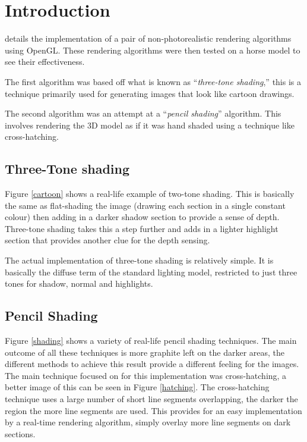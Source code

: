 \section{Introduction}
   details the implementation of a pair of non-photorealistic
  rendering algorithms using OpenGL.  These rendering algorithms were then
  tested on a horse model to see their effectiveness.

  The first algorithm was based off what is known as ``\emph{three-tone
  shading},'' this is a technique primarily used for generating images that look
  like cartoon drawings.

  The second algorithm was an attempt at a ``\emph{pencil shading}'' algorithm.
  This involves rendering the 3D model as if it was hand shaded using a
  technique like cross-hatching.

  \subsection{Three-Tone shading}

    Figure \ref{cartoon} shows a real-life example of two-tone shading.  This is
    basically the same as flat-shading the image (drawing each section in a
    single constant colour) then adding in a darker shadow section to provide a
    sense of depth.  Three-tone shading takes this a step further and adds in a
    lighter highlight section that provides another clue for the depth sensing.

    The actual implementation of three-tone shading is relatively simple.  It is
    basically the diffuse term of the standard lighting model, restricted to
    just three tones for shadow, normal and highlights.

  \subsection{Pencil Shading}

    Figure \ref{shading} shows a variety of real-life pencil shading techniques.
    The main outcome of all these techniques is more graphite left on the darker
    areas, the different methods to achieve this result provide a different
    feeling for the images.  The main technique focused on for this
    implementation was cross-hatching, a better image of this can be seen in
    Figure \ref{hatching}.  The cross-hatching technique uses a large number of
    short line segments overlapping, the darker the region the more line
    segments are used.  This provides for an easy implementation by a real-time
    rendering algorithm, simply overlay more line segments on dark sections.

